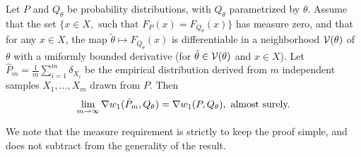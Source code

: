 \documentclass{article}
\begin{document}
\begin{thm}\label{thm:consistency}
Let $P$ and $Q_\theta$ be probability distributions, with $Q_\theta$ parametrized by $\theta$. Assume that the set $\big\{ x\in X, \mbox{ such that } F_{P}(x)=F_{Q_\theta}(x) \big\}$ has measure zero, and that for any $x\in X$, the map $\tilde \theta\mapsto F_{Q_{\tilde \theta}}(x)$ is differentiable in a neighborhood ${\cal V}(\theta)$ of $\theta$ with a uniformly bounded derivative (for $\tilde\theta\in {\cal V}(\theta)$ and $x\in X$).
Let $\hat P_m=\frac 1m \sum_{i=1}^m \delta_{X_i}$ be the empirical distribution derived from $m$ independent samples $X_1,\dots, X_m$ drawn from $P$. Then
\begin{equation*}
\lim_{m \to \infty} \nabla w_1(\hat P_m, Q_\theta) = \nabla w_1(P, Q_\theta), \mbox{ almost surely.} 
\end{equation*}
\end{thm}
We note that the measure requirement is strictly to keep the proof simple, and does not subtract from the generality of the result.
\end{document}
